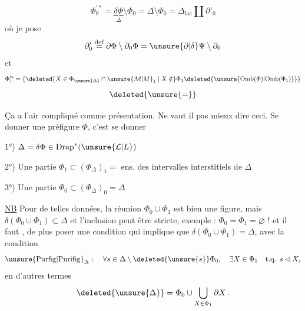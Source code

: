 \[
\Phi_0^{\prime *}=\underbrace{\delta\Phi}_{\Delta}\setminus\Phi_0=\Delta\setminus\Phi_0=\Delta_{\mathrm{lac}}\amalg\partial'_0
\]
où je pose
\[
\partial'_0\overset{\mathrm{def}}{=}\partial\Phi\setminus\partial_0\Phi=\unsure{\partial|\delta}\Psi\setminus\partial_0
\]
et
\[
\Phi_1^{\prime *}=\{\deleted{X\in\Phi_{\unsure{\Delta}}\cap\unsure{\mathcal{M}|M}_1\mid X\notin}\Phi_1\deleted{\unsure{\mathrm{Omb}(\Phi)|\mathrm{Omb}(\Phi_1)}}\}
\]
\[
\deleted{\unsure{=}}
\]

Ça a l'air  compliqué comme présentation. Ne vaut il pas mieux dire ceci. Se donner une préfigure $\Phi$, c'est se donner

1°) $\Delta=\delta\Phi\in\mathrm{Drap}^{*}(\unsure{\mathcal{L}|L})$

2°) Une partie $\Phi_1\subset(\Phi_{\Delta})_1={}$ ens. des intervalles interstitiels de $\Delta$

3°) Une partie $\Phi_0\subset(\Phi_{\Delta})_0=\Delta$

\unsure{(}\uline{NB} Pour de telles données, la réunion $\Phi_0\cup\Phi_1$ est bien une figure, mais $\delta(\Phi_0\cup\Phi_1)\subset\Delta$ et l'inclusion peut être stricte, exemple : $\Phi_0=\Phi_1=\varnothing$ !\unsure{)} et il faut , de plus poser une condition qui implique que $\delta(\Phi_0\cup\Phi_1)=\Delta$\unsure{\}},  avec la condition
\[
\unsure{\mathrm{Purfig}|\mathrm{Purifig}}_{\Delta}:\quad\forall s\in\Delta\setminus\deleted{\unsure{s}}\Phi_0,\quad\exists X\in\Phi_1\quad\text{t.q. }s\lhd X,
\]
en d'autres termes
\[
\deleted{\unsure{\Delta}}=\Phi_0\cup\bigcup_{X\in\Phi_1}\partial X\,.
\]

